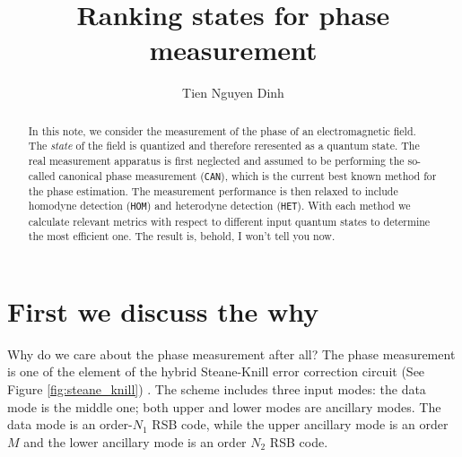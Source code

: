 \documentclass{article}
\title{Ranking states for phase measurement}
\author{Tien Nguyen Dinh}
\begin{document}
\maketitle

\begin{abstract}
In this note, we consider the measurement of the phase of an electromagnetic field. The \textit{state} of the field is quantized and therefore reresented as a quantum state. The real measurement apparatus is first neglected and assumed to be performing the so-called canonical phase measurement (\texttt{CAN}), which is the current best known method for the phase estimation. The measurement performance is then relaxed to include homodyne detection (\texttt{HOM}) and heterodyne detection (\texttt{HET}). With each method we calculate relevant metrics with respect to different input quantum states to determine the most efficient one. The result is, behold, I won't tell you now. 
\end{abstract}

\section{First we discuss the why}

Why do we care about the phase measurement after all? The phase measurement is one of the element of the hybrid Steane-Knill error correction circuit (See Figure \ref{fig:steane_knill}) \cite{Grimsmo_2020}. The scheme includes three input modes: the data mode is the middle one; both upper and lower modes are ancillary modes. The data mode is an order-$N_1$ RSB code, while the upper ancillary mode is an order $M$ and the lower ancillary mode is an order $N_2$ RSB code. 
\end{document}
